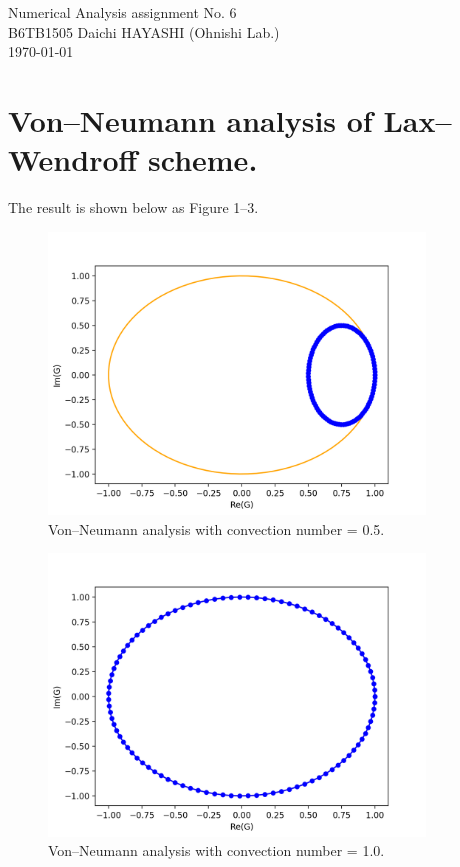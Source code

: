 \documentclass[a4paper,11pt]{article}
\begin{document}
%
\begin{center}
  {\fontsize{16pt}{16pt}\selectfont Numerical Analysis assignment No. 6\\}
  \vspace{16pt}
  \fontsize{10.5pt}{12pt}\selectfont
  B6TB1505 Daichi HAYASHI (Ohnishi Lab.)\\
  \vspace{10.5pt}
  \today \\
  \vspace{-2mm}
\end{center}

\section{Von–Neumann analysis of Lax–Wendroff scheme.}
The result is shown below as Figure 1–3.

\begin{figure}[H]
	\centering
	\includegraphics[width=10cm]{fig/vn05.png}
	\caption{Von–Neumann analysis with convection number = 0.5.} 
\end{figure}

\begin{figure}[H]
	\centering
	\includegraphics[width=10cm]{fig/vn10.png}
	\caption{Von–Neumann analysis with convection number = 1.0.} 
\end{figure}
\end{document}
